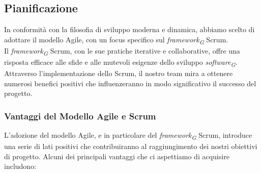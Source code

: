 \subsection{Pianificazione}\label{subsec:Pianificazione}
    In conformità con la filosofia di sviluppo moderna e dinamica, abbiamo scelto di adottare il modello Agile, con un focus specifico sul \textit{framework}\textsubscript{\textit{G}} Scrum. \\
    Il \textit{framework}\textsubscript{\textit{G}} Scrum, con le sue pratiche iterative e collaborative, offre una risposta efficace alle sfide e alle mutevoli esigenze dello sviluppo \textit{software}\textsubscript{\textit{G}}.\\
    Attraverso l’implementazione dello Scrum, il nostro team mira a ottenere numerosi benefici positivi che influenzeranno in modo significativo il successo del progetto.
    
\subsubsection{Vantaggi del Modello Agile e Scrum}
    L'adozione del modello Agile, e in particolare del \textit{framework}\textsubscript{\textit{G}} Scrum, introduce una serie di lati positivi che contribuiranno al raggiungimento dei nostri obiettivi di progetto.
    Alcuni dei principali vantaggi che ci aspettiamo di acquisire includono:

